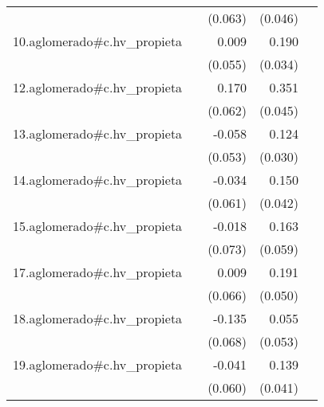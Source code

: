 {\begin{longtable}{l*{4}{D{.}{.}{-1}}}
            &                     &     (0.063)         &     (0.046)         &                     \\
\addlinespace
10.aglomerado#c.hv\_propieta&                     &       0.009         &       0.190\sym{***}&                     \\
            &                     &     (0.055)         &     (0.034)         &                     \\
\addlinespace
12.aglomerado#c.hv\_propieta&                     &       0.170\sym{**} &       0.351\sym{***}&                     \\
            &                     &     (0.062)         &     (0.045)         &                     \\
\addlinespace
13.aglomerado#c.hv\_propieta&                     &      -0.058         &       0.124\sym{***}&                     \\
            &                     &     (0.053)         &     (0.030)         &                     \\
\addlinespace
14.aglomerado#c.hv\_propieta&                     &      -0.034         &       0.150\sym{***}&                     \\
            &                     &     (0.061)         &     (0.042)         &                     \\
\addlinespace
15.aglomerado#c.hv\_propieta&                     &      -0.018         &       0.163\sym{**} &                     \\
            &                     &     (0.073)         &     (0.059)         &                     \\
\addlinespace
17.aglomerado#c.hv\_propieta&                     &       0.009         &       0.191\sym{***}&                     \\
            &                     &     (0.066)         &     (0.050)         &                     \\
\addlinespace
18.aglomerado#c.hv\_propieta&                     &      -0.135\sym{*}  &       0.055         &                     \\
            &                     &     (0.068)         &     (0.053)         &                     \\
\addlinespace
19.aglomerado#c.hv\_propieta&                     &      -0.041         &       0.139\sym{***}&                     \\
            &                     &     (0.060)         &     (0.041)         &                     \\

\end{longtable}}
